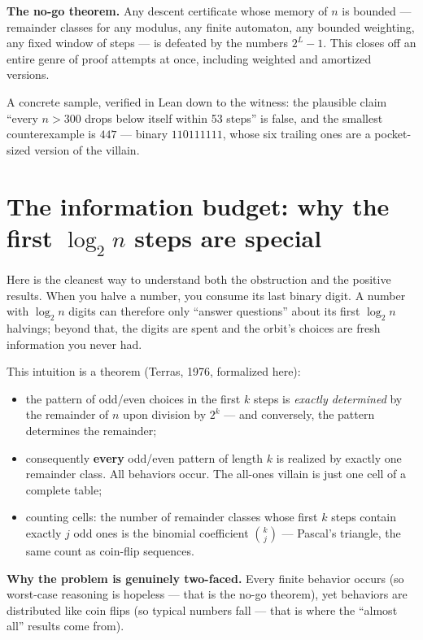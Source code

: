 \documentclass[11pt]{article}
\begin{document}
\begin{keyidea}
\textbf{The no-go theorem.} Any descent certificate whose memory of $n$
is bounded --- remainder classes for any modulus, any finite automaton,
any bounded weighting, any fixed window of steps --- is defeated by the
numbers $2^L - 1$. This closes off an entire genre of proof attempts at
once, including weighted and amortized versions.
\end{keyidea}

A concrete sample, verified in Lean down to the witness: the plausible
claim ``every $n > 300$ drops below itself within 53 steps'' is false,
and the smallest counterexample is $447$ --- binary
$110111111$, whose six trailing ones are a pocket-sized version of the
villain.

\section{The information budget: why the first $\log_2 n$ steps are
special}

Here is the cleanest way to understand both the obstruction and the
positive results. When you halve a number, you consume its last binary
digit. A number with $\log_2 n$ digits can therefore only ``answer
questions'' about its first $\log_2 n$ halvings; beyond that, the digits
are spent and the orbit's choices are fresh information you never had.

This intuition is a theorem (Terras, 1976, formalized here):
\begin{itemize}
\item the pattern of odd/even choices in the first $k$ steps is
\emph{exactly determined} by the remainder of $n$ upon division by
$2^k$ --- and conversely, the pattern determines the remainder;
\item consequently \textbf{every} odd/even pattern of length $k$
is realized by exactly one remainder class. All behaviors occur. The
all-ones villain is just one cell of a complete table;
\item counting cells: the number of remainder classes whose first $k$
steps contain exactly $j$ odd ones is the binomial coefficient
$\binom{k}{j}$ --- Pascal's triangle, the same count as coin-flip
sequences.
\end{itemize}

\begin{keyidea}
\textbf{Why the problem is genuinely two-faced.} Every finite behavior
occurs (so worst-case reasoning is hopeless --- that is the no-go
theorem), yet behaviors are distributed like coin flips (so typical
numbers fall --- that is where the ``almost all'' results come from).
\end{keyidea}
\end{document}
